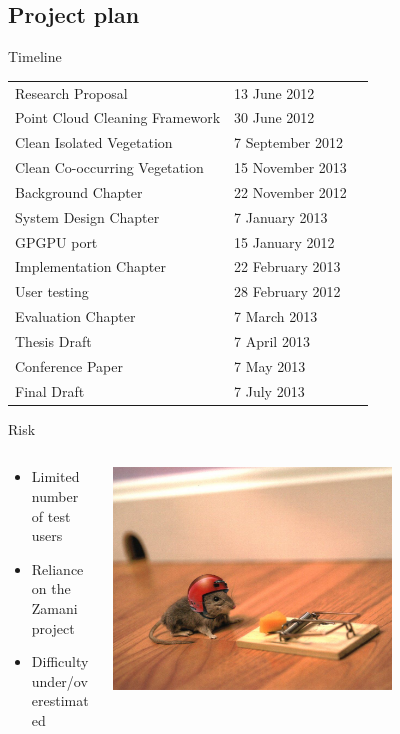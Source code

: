 \documentclass{beamer}
\begin{document}
\subsection{Project plan}
\begin{frame}{Timeline}
\begin{table}[h]
\begin{tabular}{llr}
Research Proposal & 13 June 2012\\
Point Cloud Cleaning Framework & 30 June 2012\\
Clean Isolated Vegetation & 7 September 2012\\
Clean Co-occurring Vegetation & 15 November 2013\\
Background Chapter & 22 November 2012\\
System Design Chapter & 7 January 2013\\
GPGPU port & 15 January 2012\\
Implementation Chapter & 22 February 2013\\
User testing & 28 February 2012\\ %
Evaluation Chapter & 7 March 2013\\
Thesis Draft & 7 April 2013\\
Conference Paper & 7 May 2013\\
Final Draft & 7 July 2013\\
\end{tabular}
\end{table}
\end{frame}

\begin{frame}{Risk}
\begin{columns}[T]
\begin{column}{0.5\textwidth}
	\begin{itemize}
	    \item Limited number of test users
		\item Reliance on the Zamani project
		\item Difficulty under/overestimated
	\end{itemize}
\end{column}
\begin{column}{0.5\textwidth}
\includegraphics[width=0.7\textwidth]{pics/risk2}
\end{column}
\end{columns}
\end{frame}
\end{document}
